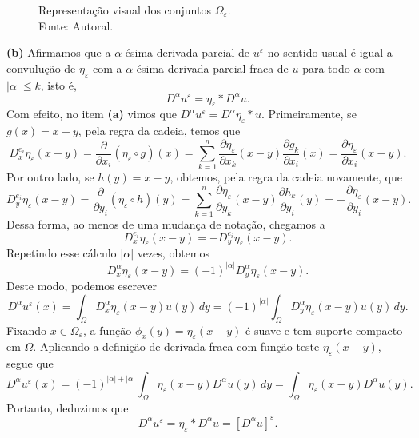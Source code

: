 \documentclass[a4paper, 11pt]{book}
\theoremstyle{definition}
\begin{document}
\begin{prf}
    \begin{figure}
        \centering
        
        \caption{Representação visual dos conjuntos $\Omega_\varepsilon$.\\Fonte: Autoral.}
    \end{figure}

    \textbf{(b)} Afirmamos que a $\alpha$-ésima derivada parcial de $u^\varepsilon$ no sentido usual é igual a convulução de $\eta_\varepsilon$ com a $\alpha$-ésima derivada parcial fraca de $u$ para todo $\alpha$ com $|\alpha| \leqslant k$, isto é,
    \[
        D^\alpha u^\varepsilon = \eta_\varepsilon * D^\alpha u.
    \]
    Com efeito, no item \textbf{(a)} vimos que $D^\alpha u^\varepsilon = D^\alpha \eta_\varepsilon * u$. Primeiramente, se $g(x) = x - y$, pela regra da cadeia, temos que
    \[
        D^{e_i}_x \eta_\varepsilon (x -y) = \dfrac{\partial}{\partial x_i} (\eta_\varepsilon \circ g)(x) = \sum_{k=1}^n \dfrac{\partial \eta_\varepsilon}{\partial x_k} (x - y) \dfrac{\partial g_k}{\partial x_i}(x) = \dfrac{\partial \eta_\varepsilon}{\partial x_i}(x-y).
    \]
    Por outro lado, se $h(y) = x - y$, obtemos, pela regra da cadeia novamente, que
    \[
        D^{e_i}_y \eta_\varepsilon (x-y) = \dfrac{\partial}{\partial y_i} (\eta_\varepsilon \circ h)(y) = \sum_{k=1}^n \dfrac{\partial \eta_\varepsilon}{\partial y_k} (x - y) \dfrac{\partial h_k}{\partial y_i}(y) = -\dfrac{\partial \eta_\varepsilon}{\partial y_i}(x-y).
    \]
    Dessa forma, ao menos de uma mudança de notação, chegamos a
    \[
        D^{e_i}_x \eta_\varepsilon (x-y) = -D^{e_i}_y \eta_\varepsilon (x-y).
    \]
    Repetindo esse cálculo $|\alpha|$ vezes, obtemos
    \[
        D^\alpha_x \eta_\varepsilon (x-y) = (-1)^{|\alpha|} D^\alpha_y \eta_\varepsilon (x-y).
    \]
    Deste modo, podemos escrever
    \[
        D^{\alpha} u^\varepsilon (x) = \int_\Omega D^\alpha_x \eta_\varepsilon (x-y) u(y) \,dy = (-1)^{|\alpha|} \int_\Omega D^{\alpha}_y \eta_\varepsilon (x-y) u(y) \,dy.
    \]
    Fixando $x \in \Omega_\varepsilon$, a função $\phi_x(y) =\eta_\varepsilon(x-y)$ é suave e tem suporte compacto em $\Omega$.
    Aplicando a definição de derivada fraca com função teste $\eta_\varepsilon(x-y)$, segue que
    \[
        D^\alpha u^\varepsilon(x) = (-1)^{|\alpha| + |\alpha|}  \int_\Omega \eta_\varepsilon(x-y) D^{\alpha} u(y) \,dy = \int_\Omega \eta_\varepsilon(x-y) D^\alpha u(y).
    \]
    Portanto, deduzimos que
    \begin{equation}
        D^\alpha u^\varepsilon = \eta_\varepsilon * D^\alpha u = [D^\alpha u]^\varepsilon.
    \end{equation}


\end{prf}
\end{document}
